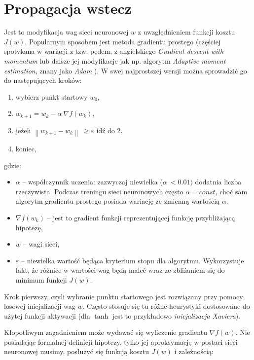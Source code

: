 \section{Propagacja wstecz}
\label{sec:backprob}

Jest to modyfikacja wag sieci neuronowej \(w\) z uwzględnieniem funkcji kosztu \(J(w)\). Popularnym sposobem jest metoda gradientu prostego \cite{gd} (częściej spotykana w wariacji z tzw. pędem, z angielskiego \textit{Gradient descent with momentum} lub dalsze jej modyfikacje jak np. algorytm
\textit{Adaptive moment estimation}, znany jako \textit{Adam} \cite{adampaper}). W swej najprostszej wersji można sprowadzić go do następujących kroków:

\begin{enumerate}
\def\labelenumi{\arabic{enumi}.}
\item
  wybierz punkt startowy \(w_{0}\),
\item
  \(w_{k + 1} = w_{k} - \alpha\ \nabla f(w_{k})\),
\item
  jeżeli \(\left\| w_{k + 1} - w_{k} \right\|\  \geq \varepsilon\) idź
  do 2,
\item
  koniec,
\end{enumerate}

gdzie:

\begin{itemize}
\item
  \(\alpha\) -- współczynnik uczenia: zazwyczaj niewielka
  (\(\alpha\  < 0.01)\) dodatnia liczba rzeczywista. Podczas treningu
  sieci neuronowych często \(\alpha = const\), choć sam algorytm
  gradientu prostego posiada wariację ze zmienną wartością \(\alpha\).
\item
  \(\nabla f(w_{k})\) -- jest to gradient funkcji reprezentującej
  funkcję przybliżającą hipotezę.
\item
  \(w\) -- wagi sieci,
\item
  \(\varepsilon\) -- niewielka wartość będąca kryterium stopu dla
  algorytmu. Wykorzystuje fakt, że różnice w wartości wag będą maleć
  wraz ze zbliżaniem się do minimum funkcji \(J(w)\).
\end{itemize}

Krok pierwszy, czyli wybranie punktu startowego jest rozwiązany przy pomocy losowej inicjalizacji wag \(w\). Często stosuje się tu różne heurystyki dostosowane do użytej funkcji aktywacji (dla \(\tanh\) jest to przykładowo \textit{inicjalizacja Xaviera}).

Kłopotliwym zagadnieniem może wydawać się wyliczenie gradientu \(\nabla f(w)\). Nie posiadając formalnej definicji hipotezy, tylko jej aproksymację w postaci sieci neuronowej musimy, posłużyć się funkcją kosztu \(J(w)\) i zależnością:

